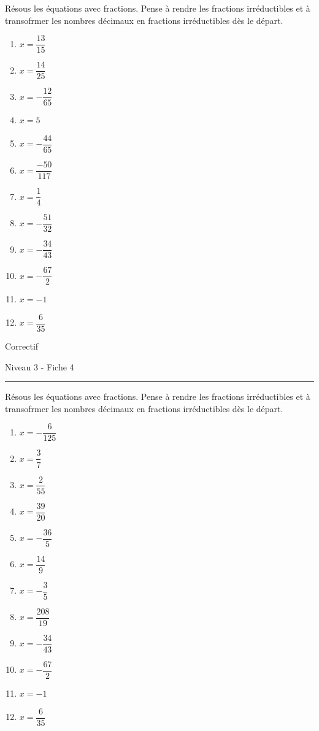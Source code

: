 \documentclass[12pt,parskip=half-, twoside=semi]{scrartcl}
\begin{document}
\begin{exercise}
  Résous les équations avec fractions. Pense à rendre les fractions irréductibles et à transofrmer les nombres décimaux en fractions irréductibles dès le départ.
  \begin{enumerate}[itemsep=0.4cm]
      \item $x=\dfrac{13}{15}$
      \item $x=\dfrac{14}{25}$
      \item $x=-\dfrac{12}{65}$
      \item $x=5$
      \item $x=-\dfrac{44}{65}$
      \item $x=\dfrac{-50}{117}$
      \item $x=\dfrac{1}{4}$
      \item $x=-\dfrac{51}{32}$
      \item $x=-\dfrac{34}{43}$
      \item $x=-\dfrac{67}{2}$
      \item $x=-1$
      \item $x=\dfrac{6}{35}$
  \end{enumerate}
\end{exercise}


\newpage


\begin{center}
  \bfseries
  \begin{Huge}
    Correctif
  \end{Huge}
  \smallbreak
  \begin{large}
    Niveau 3  - Fiche 4
  \end{large}
  \smallbreak
  \rule[10pt]{.5\linewidth}{1 pt}
\end{center}
\setcounter{exercise}{0}


\begin{exercise}
  Résous les équations avec fractions. Pense à rendre les fractions irréductibles et à transofrmer les nombres décimaux en fractions irréductibles dès le départ.
  \begin{enumerate}[itemsep=0.4cm]    
      \item $x=-\dfrac{6}{125}$
      \item $x=\dfrac{3}{7}$
      \item $x=\dfrac{2}{55}$
      \item $x=\dfrac{39}{20}$
      \item $x=-\dfrac{36}{5}$
      \item $x=\dfrac{14}{9}$
      \item $x=-\dfrac{3}{5}$
      \item $x=\dfrac{208}{19}$
      \item $x=-\dfrac{34}{43}$
      \item $x=-\dfrac{67}{2}$
      \item $x=-1$
      \item $x=\dfrac{6}{35}$
  \end{enumerate}
\end{exercise}
\end{document}
